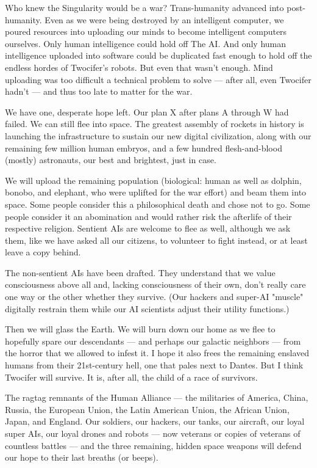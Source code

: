 \documentclass{report}  %
\begin{document}
Who knew the Singularity would be a war? Trans-humanity advanced into post-humanity. Even as we were being destroyed by an intelligent computer, we poured resources into uploading our minds to become intelligent computers ourselves. Only human intelligence could hold off The AI. And only human intelligence uploaded into software could be duplicated fast enough to hold off the endless hordes of Twocifer's robots. But even that wasn’t enough. Mind uploading was too difficult a technical problem to solve --- after all, even Twocifer hadn't --- and thus too late to matter for the war.

We have one, desperate hope left. Our plan X after plans A through W had failed. We can still flee into space. The greatest assembly of rockets in history is launching the infrastructure to sustain our new digital civilization, along with our remaining few million human embryos, and a few hundred flesh-and-blood (mostly) astronauts, our best and brightest, just in case. 

We will upload the remaining population (biological: human as well as dolphin, bonobo, and elephant, who were uplifted for the war effort) and beam them into space. Some people consider this a philosophical death and chose not to go. Some people consider it an abomination and would rather risk the afterlife of their respective religion. Sentient AIs are welcome to flee as well, although we ask them, like we have asked all our citizens, to volunteer to fight instead, or at least leave a copy behind. 

The non-sentient AIs have been drafted. They understand that we value consciousness above all and, lacking consciousness of their own, don't really care one way or the other whether they survive. (Our hackers and super-AI "muscle" digitally restrain them while our AI scientists adjust their utility functions.)

Then we will glass the Earth. We will burn down our home as we flee to hopefully spare our descendants –-- and perhaps our galactic neighbors –-- from the horror that we allowed to infest it. I hope it also frees the remaining enslaved humans from their 21st-century hell, one that pales next to Dantes. But I think Twocifer will survive. It is, after all, the child of a race of survivors.

The ragtag remnants of the Human Alliance –-- the militaries of America, China, Russia, the European Union, the Latin American Union, the African Union, Japan, and England. Our soldiers, our hackers, our tanks, our aircraft, our loyal super AIs, our loyal drones and robots --– now veterans or copies of veterans of countless battles –-- and the three remaining, hidden space weapons will defend our hope to their last breaths (or beeps). 
\end{document}
